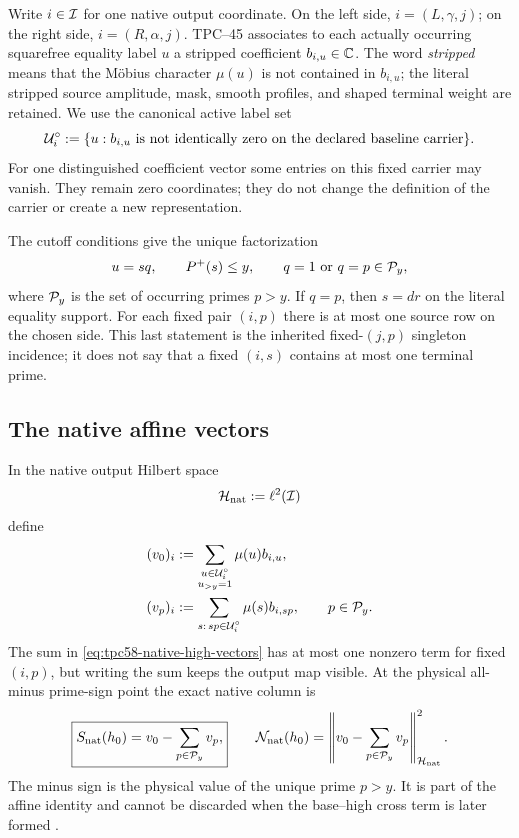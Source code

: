 Write \(i\in\mathcal I\) for one native output coordinate.  On the left side,
\(i=(L,\gamma,j)\); on the right side, \(i=(R,\alpha,j)\).  TPC--45
associates to each actually occurring squarefree equality label \(u\) a
stripped coefficient \(b_{i,u}\in\mathbb C\).  The word \emph{stripped} means that
the M\"obius character \(\mu(u)\) is not contained in \(b_{i,u}\); the
 literal stripped source amplitude, mask, smooth profiles, and shaped
 terminal weight are retained.  We use the canonical active label set
\begin{equation}
 \mathcal U_i^\circ:=\{u:b_{i,u}\text{ is not identically zero on the declared
 baseline carrier}\}.
 \label{eq:tpc58-baseline-native-labels}
\end{equation}
For one distinguished coefficient vector some entries on this fixed
carrier may vanish.  They remain zero coordinates; they do not change the
definition of the carrier or create a new representation.

The cutoff conditions give the unique factorization
\begin{equation}
 u=sq,
 \qquad P^+(s)\le y,
 \qquad q=1\ \text{or}\ q=p\in\mathcal P_y,
 \label{eq:tpc58-low-high-factorization}
\end{equation}
where \(\mathcal P_y\) is the set of occurring primes \(p>y\).  If \(q=p\), then
\(s=dr\) on the literal equality support.  For each fixed pair \((i,p)\)
there is at most one source row on the chosen side.  This last statement is
the inherited fixed-\((j,p)\) singleton incidence; it does not say that a
fixed \((i,s)\) contains at most one terminal prime.

\subsection{The native affine vectors}

In the native output Hilbert space
\begin{equation}
 \mathcal H_{\rm nat}:=\ell^2(\mathcal I)
 \label{eq:tpc58-native-space}
\end{equation}
define
\begin{align}
 (v_0)_i
 &:=\sum_{\substack{u\in\mathcal U_i^\circ\\u_{>y}=1}}
       \mu(u)b_{i,u},
 \label{eq:tpc58-native-base-vector}\\
 (v_p)_i
 &:=\sum_{\substack{s:\,sp\in\mathcal U_i^\circ}}
       \mu(s)b_{i,sp},
 \qquad p\in\mathcal P_y.
 \label{eq:tpc58-native-high-vectors}
\end{align}
The sum in \eqref{eq:tpc58-native-high-vectors} has at most one nonzero
term for fixed \((i,p)\), but writing the sum keeps the output map visible.
At the physical all-minus prime-sign point the exact native column is
\begin{equation}
 \boxed{
 S_{\rm nat}(h_0)=v_0-\sum_{p\in\mathcal P_y}v_p,}
 \qquad
 \mathcal N_{\rm nat}(h_0)=
 \left\|v_0-\sum_{p\in\mathcal P_y}v_p\right\|_{\mathcal H_{\rm nat}}^2.
 \label{eq:tpc58-native-affine-column}
\end{equation}
The minus sign is the physical value of the unique prime \(p>y\).  It is
part of the affine identity and cannot be discarded when the base--high
cross term is later formed \citep{WangTPC45}.

